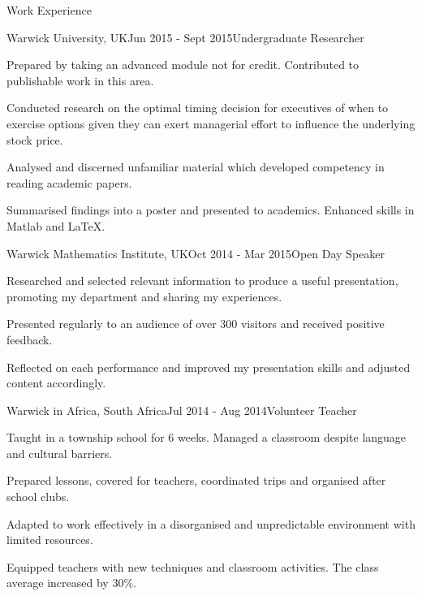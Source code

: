 \documentclass{resume} %
\begin{document}

\begin{rSection}{Work Experience}

\begin{rSubsection}{Warwick University, UK}{Jun 2015 - Sept 2015}{Undergraduate Researcher}{}
\item Prepared by taking an advanced module not for credit. Contributed to publishable work in this area. 
\item Conducted research on the optimal timing decision for executives of when to exercise options given they can exert managerial effort to influence the underlying stock price.
\item Analysed and discerned unfamiliar material which developed competency in reading academic papers.
\item Summarised findings into a poster and presented to academics. Enhanced skills in Matlab and LaTeX.
\end{rSubsection}


\begin{rSubsection}{Warwick Mathematics Institute, UK}{Oct 2014 - Mar 2015}{Open Day Speaker}{}
\item Researched and selected  relevant information to produce a useful presentation, promoting my department and sharing my experiences. 
\item Presented regularly to an audience of over 300 visitors and received positive feedback. 
\item Reflected on each performance and improved my presentation skills and adjusted content accordingly.
\end{rSubsection}


\begin{rSubsection}{Warwick in Africa, South Africa}{Jul 2014 - Aug 2014}{Volunteer Teacher}{}
\item Taught in a township school for 6 weeks. Managed a classroom despite language and cultural barriers.
\item Prepared lessons, covered for teachers, coordinated trips and organised after school clubs.
\item Adapted to work effectively in a disorganised and unpredictable environment with limited resources.
\item Equipped teachers with new techniques and classroom activities. The class average increased by 30\%.  
\end{rSubsection}




\end{rSection}
\end{document}
